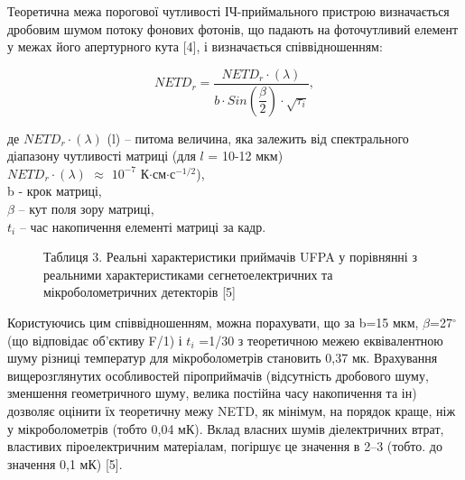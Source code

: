 \documentclass[a4paper,14pt]{extreport}
\begin{document}
Теоретична межа порогової чутливості ІЧ-приймального
пристрою визначається дробовим шумом потоку фонових фотонів,
що падають на фоточутливий елемент у межах його апертурного кута [4], і визначається співвідношенням:

\begin{equation}
NETD_r = \dfrac{NETD_r\cdot (\lambda)}{b\cdot Sin(\dfrac{\beta}{2})\cdot \sqrt{\tau_i}},
\end{equation}


де $NETD_r\cdot (\lambda)$
(l) – питома величина, яка залежить від спектрального
діапазону чутливості матриці (для $l$ = 10-12 мкм)\\
$NETD_r\cdot (\lambda)$ $\approx$ $10^{-7}$ К$\cdot$см$\cdot$с$^{-1/2}$),\\ 
b - крок матриці,\\ 
$\beta$ – кут поля зору матриці,\\ 
$t_i$ – час накопичення елементі матриці за кадр.\\ 
\begin{figure}[h!]
Таблиця 3. Реальні характеристики приймачів UFPA у порівнянні
з реальними характеристиками сегнетоелектричних та мікроболометричних детекторів [5]

\label{ris2}
\end{figure}

Користуючись цим співвідношенням, можна порахувати, що за
b=15 мкм, $\beta$=27$^{\circ}$ (що відповідає об'єктиву F/1) і $t_i$ =1/30 з теоретичною межею еквівалентною шуму різниці температур для
мікроболометрів становить 0,37 мк. Врахування вищерозглянутих особливостей піроприймачів (відсутність дробового шуму, зменшення геометричного шуму, велика постійна часу накопичення
та ін) дозволяє оцінити їх теоретичну межу NETD, як мінімум, на порядок краще, ніж у мікроболометрів (тобто  0,04 мК). Вклад
власних шумів діелектричних втрат, властивих піроелектричним матеріалам, погіршує це значення в 2–3 (тобто. до значення  0,1 мК) [5].
\end{document}
